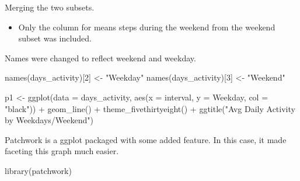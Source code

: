 \documentclass[
]{article}
\newenvironment{Shaded}{\begin{snugshade}}{\end{snugshade}}
\newcommand{\AttributeTok}[1]{\textcolor[rgb]{0.77,0.63,0.00}{#1}}
\newcommand{\DecValTok}[1]{\textcolor[rgb]{0.00,0.00,0.81}{#1}}
\newcommand{\FunctionTok}[1]{\textcolor[rgb]{0.00,0.00,0.00}{#1}}
\newcommand{\NormalTok}[1]{#1}
\newcommand{\OtherTok}[1]{\textcolor[rgb]{0.56,0.35,0.01}{#1}}
\newcommand{\SpecialCharTok}[1]{\textcolor[rgb]{0.00,0.00,0.00}{#1}}
\newcommand{\StringTok}[1]{\textcolor[rgb]{0.31,0.60,0.02}{#1}}
\providecommand{\tightlist}{%
  \setlength{\itemsep}{0pt}\setlength{\parskip}{0pt}}
\begin{document}
Merging the two subsets.

\begin{itemize}
\tightlist
\item
  Only the column for means steps during the weekend from the weekend
  subset was included.
\end{itemize}

\begin{Shaded}
\end{Shaded}

Names were changed to reflect weekend and weekday.

\begin{Shaded}
\begin{Highlighting}[]
\FunctionTok{names}\NormalTok{(days\_activity)[}\DecValTok{2}\NormalTok{] }\OtherTok{\textless{}{-}} \StringTok{"Weekday"}
\FunctionTok{names}\NormalTok{(days\_activity)[}\DecValTok{3}\NormalTok{] }\OtherTok{\textless{}{-}} \StringTok{"Weekend"}
\end{Highlighting}
\end{Shaded}

\begin{Shaded}
\begin{Highlighting}[]
\NormalTok{p1 }\OtherTok{\textless{}{-}} \FunctionTok{ggplot}\NormalTok{(}\AttributeTok{data =}\NormalTok{ days\_activity, }\FunctionTok{aes}\NormalTok{(}\AttributeTok{x =}\NormalTok{ interval, }\AttributeTok{y =}\NormalTok{ Weekday, }\AttributeTok{col =} \StringTok{"black"}\NormalTok{)) }\SpecialCharTok{+} 
  \FunctionTok{geom\_line}\NormalTok{() }\SpecialCharTok{+} \FunctionTok{theme\_fivethirtyeight}\NormalTok{() }\SpecialCharTok{+} \FunctionTok{ggtitle}\NormalTok{(}\StringTok{"Avg Daily Activity by Weekdays/Weekend"}\NormalTok{)}
\end{Highlighting}
\end{Shaded}

Patchwork is a ggplot packaged with some added feature. In this case, it
made faceting this graph much easier.

\begin{Shaded}
\begin{Highlighting}[]
\FunctionTok{library}\NormalTok{(patchwork)}
\end{Highlighting}
\end{Shaded}
\end{document}
